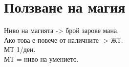 \section{Ползване на магия}
Ниво на магията -> брой зарове мана.  \\
Ако това е повече от наличните -> ЖТ. \\
МТ 1/ден.                             \\
МТ = ниво на умението.                \\

%
%
%
%
%
%
%
%

